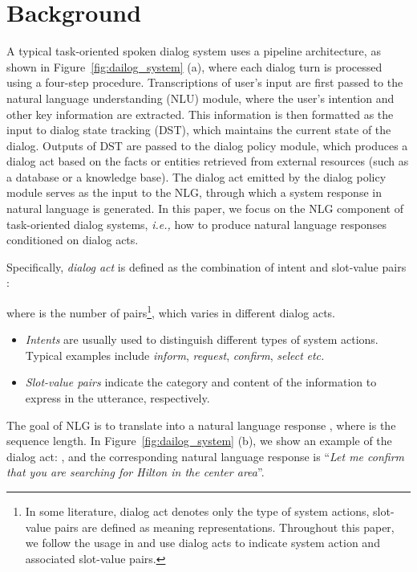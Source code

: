 \documentclass[11pt,a4paper]{article}
\newcommand{\ie}[0]{\emph{i.e., }}
\newcommand{\etc}[0]{\emph{etc.}}
\begin{document}
\section{Background}
A typical task-oriented spoken dialog system uses a pipeline architecture, as shown in Figure~\ref{fig:dailog_system} (a), where each dialog turn is processed using a four-step procedure.
 Transcriptions of user’s input are first passed to the natural language understanding (NLU)
module, where the user’s intention and other key information are extracted. 
 This information is then formatted as the input to dialog state tracking (DST), which maintains
the current state of the dialog. 
  Outputs of DST are passed to the dialog policy module, which produces a dialog act based on the facts or entities retrieved from external resources (such as a database or a knowledge base).
  The dialog act emitted by the dialog policy module serves as the input to
the NLG, through which a system response in natural language is generated. 
In this paper, we focus
on the NLG component of task-oriented dialog
systems, \ie how to produce natural language responses conditioned on dialog acts.

Specifically, {\it dialog act}
 is defined as the combination of intent  and slot-value pairs :

where  is the number of pairs\footnote{In some literature, dialog act denotes only the type of system actions, slot-value pairs are defined as meaning representations. Throughout this paper, we follow the usage in \citet{budzianowski2018multiwoz} and use dialog acts to indicate system action and associated slot-value pairs.}, which varies in different dialog acts.   

\begin{itemize}
\setlength{\itemsep}{-3pt}
    \item {\it Intents} are usually used to distinguish different types of system actions. Typical examples include {\it inform}, {\it request}, {\it confirm}, {\it select} \etc~
    \item {\it Slot-value pairs} indicate the category and content of the information to express in the utterance, respectively.
\end{itemize}

The goal of NLG is to translate  into a natural language response , where  is the sequence length. In Figure~\ref{fig:dailog_system} (b), we show an  example of the dialog act: 
, and the corresponding natural language response is ``{\it Let me confirm that you are searching for Hilton in the center area}''. 
\end{document}
